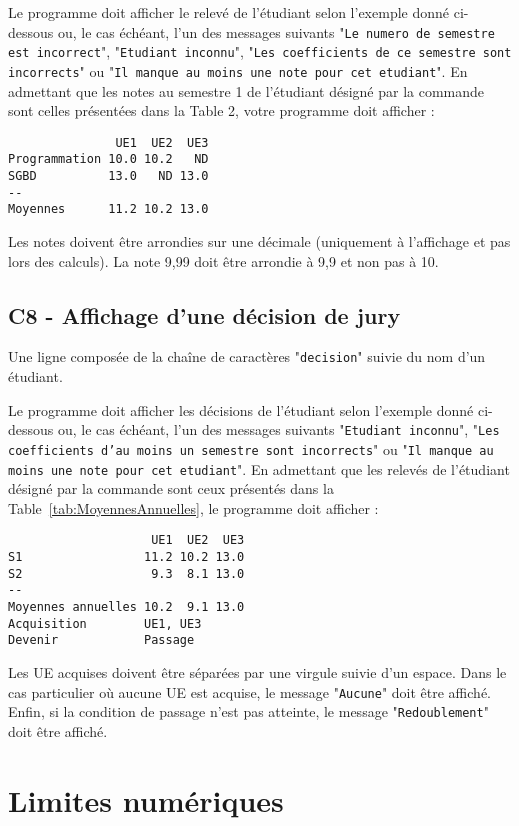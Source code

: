 \documentclass[10pt,a4paper,oneside]{article}
\begin{document}
\medskip

Le programme doit afficher le relevé de l'étudiant selon l'exemple donné ci-dessous ou, le cas échéant, l'un des messages suivants "\texttt{Le numero de semestre est incorrect}", "\texttt{Etudiant inconnu}", "\texttt{Les coefficients de ce semestre sont incorrects}" ou "\texttt{Il manque au moins une note pour cet etudiant}". En admettant que les notes au semestre 1 de l'étudiant désigné par la commande sont celles présentées dans la Table 2, votre programme doit afficher :

\begin{verbatim}
               UE1  UE2  UE3
Programmation 10.0 10.2   ND
SGBD          13.0   ND 13.0
--
Moyennes      11.2 10.2 13.0
\end{verbatim}

Les notes doivent être arrondies sur une décimale (uniquement à l'affichage et pas lors des calculs). La note 9,99 doit être arrondie à 9,9 et non pas à 10.

\subsection*{C8 - Affichage d'une décision de jury}
Une ligne composée de la chaîne de caractères "\texttt{decision}" suivie du nom d'un étudiant.

\medskip

Le programme doit afficher les décisions de l'étudiant selon l'exemple donné ci-dessous ou, le cas échéant, l'un des messages suivants "\texttt{Etudiant inconnu}", "\texttt{Les coefficients d'au moins un semestre sont incorrects}" ou "\texttt{Il manque au moins une note pour cet etudiant}". En admettant que les relevés de l'étudiant désigné par la commande sont ceux présentés dans la Table~\ref{tab:MoyennesAnnuelles}, le programme doit afficher :

\begin{verbatim}
                    UE1  UE2  UE3
S1                 11.2 10.2 13.0
S2                  9.3  8.1 13.0
--
Moyennes annuelles 10.2  9.1 13.0
Acquisition        UE1, UE3
Devenir            Passage
\end{verbatim}

Les UE acquises doivent être séparées par une virgule suivie d'un espace. Dans le cas particulier où aucune UE est acquise, le message "\texttt{Aucune}" doit être affiché. Enfin, si la condition de passage n'est pas atteinte, le message "\texttt{Redoublement}" doit être affiché. 

\section{Limites numériques}
\end{document}
